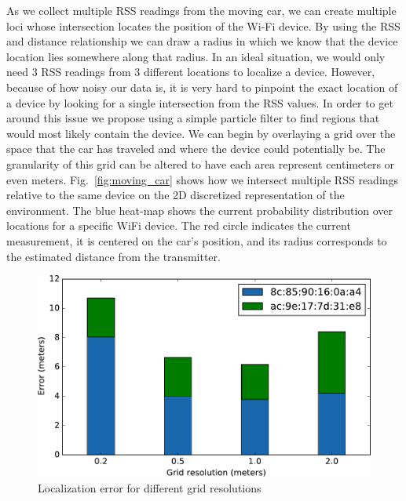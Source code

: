 \documentclass{article}
\begin{document}
As we collect multiple RSS readings from the moving car, we can create multiple loci whose 
intersection locates the position of the Wi-Fi device.
By using the RSS and distance relationship we can draw a radius in which we know
that the device location lies somewhere along that radius. In an ideal situation,
we would only need $3$ RSS readings from $3$ different locations to localize a device.
However, because of how noisy our data is, it is very hard to pinpoint the exact
location of a device by looking for a single intersection from the RSS values.
In order to get around this issue we propose using a simple particle filter to
find regions that would most likely contain the device.
We can begin by overlaying a grid over the space that the car has traveled and where
the device could potentially be. The granularity of this grid can be altered to have
each area represent centimeters or even meters. 
Fig.~\ref{fig:moving_car} shows how we intersect multiple RSS readings relative to the same device
on the 2D discretized representation of the environment. The blue heat-map shows the current 
probability distribution over locations for a specific WiFi device.
The red circle indicates the current measurement, it is centered on the
car's position, and its radius corresponds to the estimated distance from the transmitter.

\begin{figure}
    \centering
    \vspace{-12pt}
    \includegraphics[width=\linewidth]{figures/grid_resolution_study.pdf}
    \caption{Localization error for different grid resolutions \label{fig:grid_resolution_study}}
    \vspace{-32pt}
\end{figure}
\end{document}
